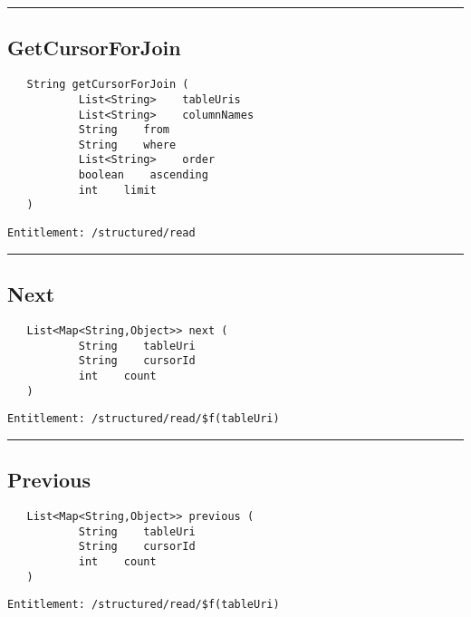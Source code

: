 \rule{12cm}{2pt}
\subsection{GetCursorForJoin}
\label{Api:GetCursorForJoin}
\begin{Verbatim}
   String getCursorForJoin (
           List<String>    tableUris
           List<String>    columnNames
           String    from
           String    where
           List<String>    order
           boolean    ascending
           int    limit
   )
\end{Verbatim}
\begin{Verbatim}[formatcom=\color{Maroon}]
  Entitlement: /structured/read
\end{Verbatim}



\rule{12cm}{2pt}
\subsection{Next}
\label{Api:Next}
\begin{Verbatim}
   List<Map<String,Object>> next (
           String    tableUri
           String    cursorId
           int    count
   )
\end{Verbatim}
\begin{Verbatim}[formatcom=\color{Maroon}]
  Entitlement: /structured/read/$f(tableUri)
\end{Verbatim}



\rule{12cm}{2pt}
\subsection{Previous}
\label{Api:Previous}
\begin{Verbatim}
   List<Map<String,Object>> previous (
           String    tableUri
           String    cursorId
           int    count
   )
\end{Verbatim}
\begin{Verbatim}[formatcom=\color{Maroon}]
  Entitlement: /structured/read/$f(tableUri)
\end{Verbatim}



